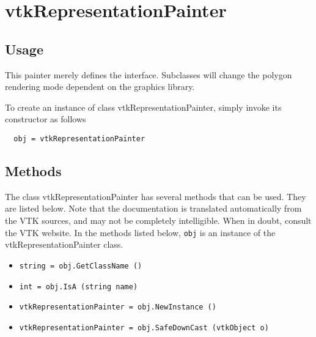 \section{vtkRepresentationPainter}

\subsection{Usage}

 This painter merely defines the interface. 
 Subclasses will change the polygon rendering mode dependent on 
 the graphics library.

To create an instance of class vtkRepresentationPainter, simply
invoke its constructor as follows
\begin{verbatim}
  obj = vtkRepresentationPainter
\end{verbatim}
\subsection{Methods}

The class vtkRepresentationPainter has several methods that can be used.
  They are listed below.
Note that the documentation is translated automatically from the VTK sources,
and may not be completely intelligible.  When in doubt, consult the VTK website.
In the methods listed below, \verb|obj| is an instance of the vtkRepresentationPainter class.
\begin{itemize}
\item  \verb|string = obj.GetClassName ()|

\item  \verb|int = obj.IsA (string name)|

\item  \verb|vtkRepresentationPainter = obj.NewInstance ()|

\item  \verb|vtkRepresentationPainter = obj.SafeDownCast (vtkObject o)|

\end{itemize}
